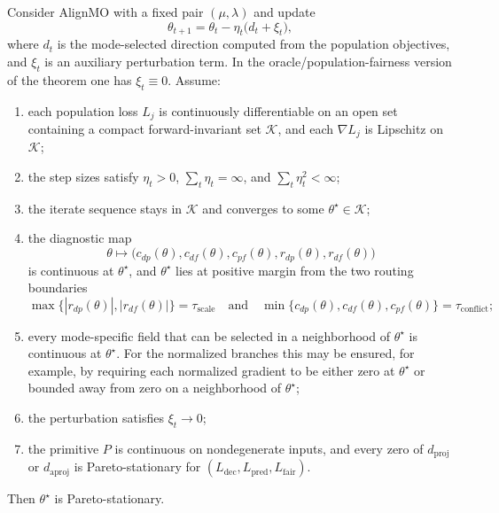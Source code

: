 \begin{proposition}
\label{prop:alignmo-main}
Consider AlignMO with a fixed pair $(\mu,\lambda)$ and update
\[
\theta_{t+1}=\theta_t-\eta_t\bigl(d_t+\xi_t\bigr),
\]
where $d_t$ is the mode-selected direction computed from the population objectives, and $\xi_t$ is an auxiliary perturbation term. In the oracle/population-fairness version of the theorem one has $\xi_t\equiv 0$.
Assume:
\begin{enumerate}
\item each population loss $L_j$ is continuously differentiable on an open set containing a compact forward-invariant set $\mathcal K$, and each $\nabla L_j$ is Lipschitz on $\mathcal K$;
\item the step sizes satisfy $\eta_t>0$, $\sum_t \eta_t=\infty$, and $\sum_t \eta_t^2<\infty$;
\item the iterate sequence stays in $\mathcal K$ and converges to some $\theta^\star\in\mathcal K$;
\item the diagnostic map
      \[
      \theta\mapsto
      \bigl(c_{dp}(\theta),c_{df}(\theta),c_{pf}(\theta),r_{dp}(\theta),r_{df}(\theta)\bigr)
      \]
      is continuous at $\theta^\star$, and $\theta^\star$ lies at positive margin from the two routing boundaries
      \[
      \max\{|r_{dp}(\theta)|,|r_{df}(\theta)|\}=\tau_{\mathrm{scale}}
      \quad\text{and}\quad
      \min\{c_{dp}(\theta),c_{df}(\theta),c_{pf}(\theta)\}=\tau_{\mathrm{conflict}};
      \]
\item every mode-specific field that can be selected in a neighborhood of $\theta^\star$
      is continuous at $\theta^\star$. For the normalized branches this may be ensured, for example,
      by requiring each normalized gradient to be either zero at $\theta^\star$ or bounded away from zero on a neighborhood of $\theta^\star$;
\item the perturbation satisfies $\xi_t\to 0$;
\item the primitive $P$ is continuous on nondegenerate inputs, and every zero of
      $d_{\mathrm{proj}}$ or $d_{\mathrm{aproj}}$ is Pareto-stationary for
      $(L_{\mathrm{dec}},L_{\mathrm{pred}},L_{\mathrm{fair}})$.
\end{enumerate}
Then $\theta^\star$ is Pareto-stationary.
\end{proposition}


